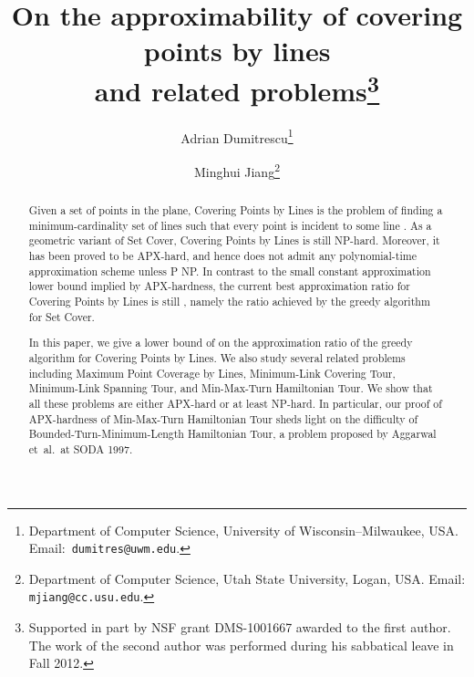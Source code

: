 \documentclass[letterpaper,11pt]{article}
\newcommand{\later}[1]{}
\begin{document}
\title{On the approximability of covering points by lines\\and related
  problems\thanks{Supported in part by NSF grant DMS-1001667 awarded to the first author.
The work of the second author was performed during his sabbatical leave
in Fall 2012.}}

\author{Adrian Dumitrescu\thanks{Department of Computer Science,
University of Wisconsin--Milwaukee, USA\@.
Email:~\texttt{dumitres@uwm.edu}.}
\and
Minghui Jiang\thanks{Department of Computer Science,
Utah State University,
Logan, USA\@.
Email: \texttt{mjiang@cc.usu.edu}.}}

\maketitle
\thispagestyle{empty}


\begin{abstract}
Given a set  of  points in the plane, {\sc Covering Points by Lines}
is the problem of finding a minimum-cardinality set  of lines
such that every point  is incident to some line .
As a geometric variant of {\sc Set Cover}, {\sc Covering Points by Lines} 
is still NP-hard. 
Moreover, it has been proved to be APX-hard, and hence
does not admit any polynomial-time approximation scheme unless P  NP\@.
In contrast to the small constant approximation lower bound
implied by APX-hardness,
the current best approximation ratio for {\sc Covering Points by Lines} 
is still , namely the ratio achieved by the greedy
algorithm for {\sc Set Cover}.

In this paper,
we give a lower bound of 
on the approximation ratio of the greedy algorithm for {\sc Covering Points by Lines}.
We also study several related problems including
{\sc Maximum Point Coverage by Lines},
{\sc Minimum-Link Covering Tour},
{\sc Minimum-Link Spanning Tour},
and {\sc Min-Max-Turn Hamiltonian Tour}.
We show that all these problems are either APX-hard or at least NP-hard.
In particular, our proof of APX-hardness of {\sc Min-Max-Turn Hamiltonian Tour}
sheds light on the difficulty of {\sc Bounded-Turn-Minimum-Length Hamiltonian Tour},
a problem proposed by Aggarwal et~al.\ at SODA 1997.

\later{
\medskip
\medskip
\textbf{\small Keywords}:
Spanning tours,
Covering tours,
NP-hardness,
APX-hardness.
}

\end{abstract}

\newpage
\setcounter{page}{1}
\setcounter{footnote}{0}
\end{document}
